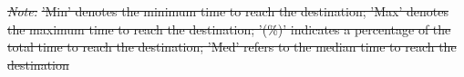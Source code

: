 \documentclass[Royal,times,sageh]{sagej}
\providecommand{\DIFdeltex}[1]{{\protect\color{red}\sout{#1}}} %
\providecommand{\DIFdel}[1]{\texorpdfstring{\DIFdeltex{#1}}{}} %
\begin{document}

\textit{\DIFdel{Note: }} 
\DIFdel{'Min' denotes the minimum time to reach the destination; 'Max' denotes the maximum time to reach the destination; '(\%)' indicates a percentage of the total time to reach the destination; 'Med' refers to the median time to reach the destination
}%
\end{document}
